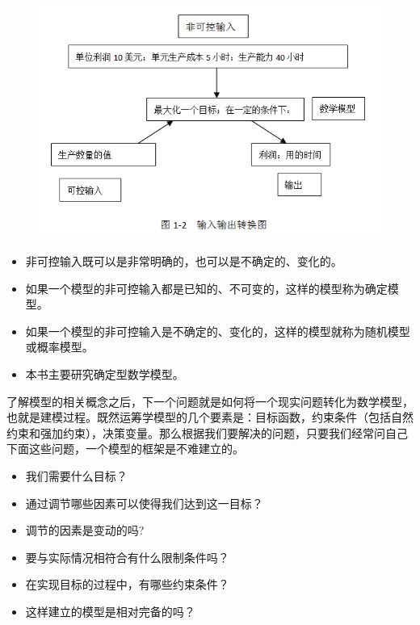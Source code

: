 \begin{frame}[allowframebreaks]{\subsubsecname}
\begin{enumerate}
\begin{figure}\label{fig:ch1-2}
  \centering
  \includegraphics[width=4 in,height=3 in]{pic/1_2.png}
  \caption{}
\end{figure}
\begin{itemize}
    \item 非可控输入既可以是非常明确的，也可以是不确定的、变化的。
\item 如果一个模型的非可控输入都是已知的、不可变的，这样的模型称为确定模型。
\item 如果一个模型的非可控输入是不确定的、变化的，这样的模型就称为随机模型或概率模型。
\item 本书主要研究确定型数学模型。
\end{itemize}
\end{enumerate}
\end{frame}

\begin{frame}{\subsubsecname}
  了解模型的相关概念之后，下一个问题就是如何将一个现实问题转化为数学模型，也就是建模过程。既然运筹学模型的几个要素是：目标函数，约束条件（包括自然约束和强加约束），决策变量。那么根据我们要解决的问题，只要我们经常问自己下面这些问题，一个模型的框架是不难建立的。

\begin{itemize}
    \item 我们需要什么目标？
    \item 通过调节哪些因素可以使得我们达到这一目标？
    \item 调节的因素是变动的吗? 
    \item 要与实际情况相符合有什么限制条件吗？
     \item 在实现目标的过程中，有哪些约束条件？
      \item 这样建立的模型是相对完备的吗？
\end{itemize}

\end{frame}


